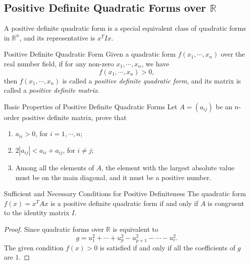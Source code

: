\subsection{Positive Definite Quadratic Forms over $\mathbb{R}$}

A positive definite quadratic form is a special equivalent class of
quadratic forms in $\mathbb{R}^n$, and its representative is $x^TIx$.

\begin{definition}{Positive Definite Quadratic Form}{}
  Given a quadratic form $f(x_1,\cdots,x_n)$ over the real number field,
  if for any non-zero $x_1,\cdots,x_n$, we have
  \begin{equation}
    f(x_1,\cdots,x_n) > 0,
  \end{equation}
  then $f(x_1,\cdots,x_n)$ is called a \emph{positive definite quadratic form},
  and its matrix is called a \emph{positive definite matrix}.
\end{definition}

\begin{example}{Basic Properties of Positive Definite Quadratic Forms}{}
  Let $A = (a_{ij})$ be an $n$-order positive definite matrix, prove that
  \begin{enumerate}
  \item $a_{ii} > 0$, for $i = 1,\cdots,n$;
  \item $2|a_{ij}| < a_{ii} + a_{ij}$, for $i \neq j$;
  \item Among all the elements of $A$, the element with the largest absolute value
    must be on the main diagonal, and it must be a positive number.
  \end{enumerate}
\end{example}

\begin{proposition}{Sufficient and Necessary Conditions for Positive Definiteness}{}
  The quadratic form $f(x) = x^TAx$ is a positive definite quadratic form
  if and only if $A$ is congruent to the identity matrix $I$.
\end{proposition}

\begin{proof}
  Since quadratic forms over $\mathbb{R}$ is equivalent to 
  \begin{equation}
    g = u_1^2 + \cdots + u_p^2 - u_{p+1}^2 - \cdots - u_r^2.
  \end{equation}
  The given condition $f(x) > 0$ is satisfied if and only if
  all the coefficients of $g$ are $1$.
\end{proof}

